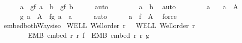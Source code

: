 \begin{isabellebody}
\ \ \ \ \isamarkupfalse%
\ {\isachardoublequoteopen}a\ {\isacharequal}{\kern0pt}\ g{\isacharparenleft}{\kern0pt}f\ a{\isacharparenright}{\kern0pt}\ {\isasymand}\ b\ {\isacharequal}{\kern0pt}\ g{\isacharparenleft}{\kern0pt}f\ b{\isacharparenright}{\kern0pt}{\isachardoublequoteclose}\ \isamarkupfalse%
\ {\isacharasterisk}{\kern0pt}\ {}\ \isamarkupfalse%
\ auto\isanewline
\ \ \ \ \isamarkupfalse%
\ {\isacharasterisk}{\kern0pt}{\isacharasterisk}{\kern0pt}\ \isamarkupfalse%
\ {\isachardoublequoteopen}a\ {\isacharequal}{\kern0pt}\ b{\isachardoublequoteclose}\ \isamarkupfalse%
\ auto\isanewline
\ \ \isamarkupfalse%
\isanewline
\ \ \ \ \isamarkupfalse%
\ a{\isacharprime}{\kern0pt}\ \isamarkupfalse%
\ {\isacharasterisk}{\kern0pt}{\isacharcolon}{\kern0pt}\ {\isachardoublequoteopen}a{\isacharprime}{\kern0pt}\ {\isasymin}\ {\isacharquery}{\kern0pt}A{\isacharprime}{\kern0pt}{\isachardoublequoteclose}\isanewline
\ \ \ \ \isamarkupfalse%
\ {\isachardoublequoteopen}g\ a{\isacharprime}{\kern0pt}\ {\isasymin}\ {\isacharquery}{\kern0pt}A\ {\isasymand}\ f{\isacharparenleft}{\kern0pt}g\ a{\isacharprime}{\kern0pt}{\isacharparenright}{\kern0pt}\ {\isacharequal}{\kern0pt}\ a{\isacharprime}{\kern0pt}{\isachardoublequoteclose}\ \isamarkupfalse%
\ {}\ {}\ \isamarkupfalse%
\ auto\isanewline
\ \ \ \ \isamarkupfalse%
\ {\isachardoublequoteopen}a{\isacharprime}{\kern0pt}\ {\isasymin}\ f\ {\isacharbackquote}{\kern0pt}\ {\isacharquery}{\kern0pt}A{\isachardoublequoteclose}\ \isamarkupfalse%
\ force\isanewline
\ \ \isamarkupfalse%
\isanewline
{}\isamarkupfalse%
%
\endisatagproof
{\isafoldproof}%
%
\isadelimproof
\isanewline
%
\endisadelimproof
\isanewline
{}\isamarkupfalse%
\ embed{\isacharunderscore}{\kern0pt}bothWays{\isacharunderscore}{\kern0pt}iso{\isacharcolon}{\kern0pt}\isanewline
{}\ WELL{\isacharcolon}{\kern0pt}\ {\isachardoublequoteopen}Well{\isacharunderscore}{\kern0pt}order\ r{\isachardoublequoteclose}\ \ \ WELL{\isacharprime}{\kern0pt}{\isacharcolon}{\kern0pt}\ {\isachardoublequoteopen}Well{\isacharunderscore}{\kern0pt}order\ r{\isacharprime}{\kern0pt}{\isachardoublequoteclose}\ \isanewline
\ \ \ \ \ \ \ \ EMB{\isacharcolon}{\kern0pt}\ {\isachardoublequoteopen}embed\ r\ r{\isacharprime}{\kern0pt}\ f{\isachardoublequoteclose}\ \ EMB{\isacharprime}{\kern0pt}{\isacharcolon}{\kern0pt}\ {\isachardoublequoteopen}embed\ r{\isacharprime}{\kern0pt}\ r\ g{\isachardoublequoteclose}\isanewline

\end{isabellebody}
